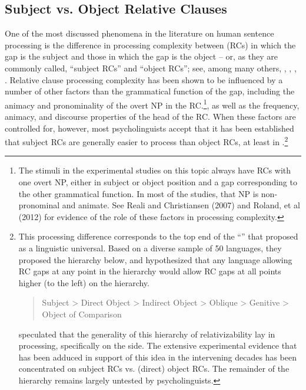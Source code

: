 \documentclass[a4paper]{article}
\begin{document}
\subsection{Subject vs. Object Relative Clauses}

One of the most discussed phenomena in the literature on human sentence processing is the difference in processing complexity between  (RCs) in which the gap is the subject and those in which the gap is the object -- or, as they are commonly called, ``subject RCs'' and ``object RCs''; see, among many others, \citet{WannerMaratsos78}, \citet{Gibson98a}, \citet{TraxlerEtal2002}, \citet{GennariMacDonald2008}.  Relative clause processing complexity has been shown to be influenced by a number of other factors than the grammatical function of the gap, including the animacy and pronominality of the overt NP in the RC.\footnote{The stimuli in the experimental studies on this topic always have RCs with one overt NP, either in subject or object position and a gap corresponding to the other grammatical function. In most of the studies, that NP is non-pronominal and animate.  See Reali and Christiansen (2007) and Roland, et al (2012) for evidence of the role of these factors in processing complexity.}, as well as the frequency, animacy, and discourse properties of the head of the RC.  When these factors are controlled for, however, most psycholinguists accept that it has been established that subject RCs are generally easier to process than object RCs, at least in .\footnote{This processing difference corresponds to the top end of the ``'' that \citet{KC77a} proposed as a linguistic universal. Based on a diverse sample of 50 languages, they proposed the hierarchy below, and hypothesized that any language allowing RC gaps at any point in the hierarchy would allow RC gaps at all points higher (to the left) on the hierarchy.
\begin{quote}

Subject 
> 
Direct Object 
> 
Indirect Object 
> 
Oblique 
> 
Genitive
> 
Object of Comparison
\end{quote}
\citeauthor{KC77a} speculated that the generality of this hierarchy of relativizability lay in processing, specifically on the  side.  The extensive experimental evidence that has been adduced in support of this idea in the intervening decades has been concentrated on subject RCs vs. (direct) object RCs.  The remainder of the hierarchy remains largely untested by psycholinguists.}
\end{document}
